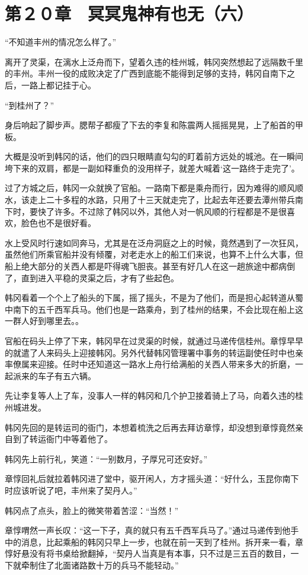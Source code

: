 \section{第２０章　冥冥鬼神有也无（六）}

“不知道丰州的情况怎么样了。”

离开了灵渠，在漓水上泛舟而下，望着久违的桂州城，韩冈突然想起了远隔数千里的丰州。丰州一役的成败决定了广西到底能不能得到足够的支持，韩冈自南下之后，一路上都记挂于心。

“到桂州了？”

身后响起了脚步声。腮帮子都瘦了下去的李复和陈震两人摇摇晃晃，上了船首的甲板。

大概是没听到韩冈的话，他们的四只眼睛直勾勾的盯着前方远处的城池。在一瞬间垮下来的双肩，都是一副如释重负的没用样子，就差大喊着‘这一路终于走完了’。

过了方城之后，韩冈一众就换了官船。一路南下都是乘舟而行，因为难得的顺风顺水，该走上二十多程的水路，只用了十三天就走完了，比起去年还要去潭州带兵南下时，要快了许多。不过除了韩冈以外，其他人对一帆风顺的行程都是不是很喜欢，脸色也不是很好看。

水上受风时行速如同奔马，尤其是在泛舟洞庭之上的时候，竟然遇到了一次狂风，虽然他们所乘官船并没有倾覆，对老走水上的船工们来说，也算不上什么大事，但船上绝大部分的关西人都是吓得魂飞胆丧。甚至有好几人在这一趟旅途中都病倒了，直到进入平稳的灵渠之后，才有了些起色。

韩冈看着一个个上了船头的下属，摇了摇头，不是为了他们，而是担心起转道从蜀中南下的五千西军兵马。他们也是一路乘舟，到了桂州的结果，不会比现在船上这一群人好到哪里去。。

官船在码头上停了下来，韩冈早在过灵渠的时候，就通过马递传信桂州。章惇早早的就遣了人来码头上迎接韩冈。另外代替韩冈管理署中事务的转运副使任时中也亲率僚属来迎接。任时中还知道这一路水上舟行给满船的关西人带来多大的折磨，一起派来的车子有五六辆。

先让李复等人上了车，没事人一样的韩冈和几个护卫接着骑上了马，向着久违的桂州城进发。

韩冈先回的是转运司的衙门，本想着梳洗之后再去拜访章惇，却没想到章惇竟然亲自到了转运衙门中等着他了。

韩冈先上前行礼，笑道：“一别数月，子厚兄可还安好。”

章惇回礼后就拉着韩冈进了堂中，驱开闲人，方才摇头道：“好什么，玉昆你南下时应该听说了吧，丰州来了契丹人。”

韩冈点了点头，脸上的微笑带着苦涩：“当然！”

章惇喟然一声长叹：“这一下子，真的就只有五千西军兵马了。”通过马递传到他手中的消息，比起乘船的韩冈只早上一步，也就在前一天到了桂州。拆开来一看，章惇好悬没有将书桌给掀翻掉，“契丹人当真是有本事，只不过是三五百的数目，一下就牵制住了北面诸路数十万的兵马不能轻动。”

